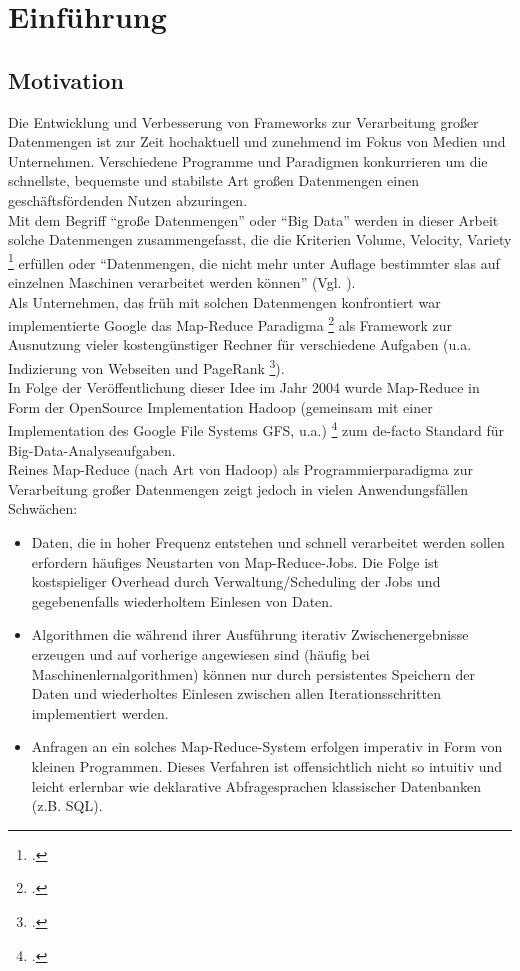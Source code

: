 \chapter{Einführung}

\section{Motivation}

Die Entwicklung und Verbesserung von Frameworks zur Verarbeitung großer Datenmengen ist zur Zeit hochaktuell und zunehmend im Fokus von Medien und Unternehmen. Verschiedene Programme und Paradigmen konkurrieren um die schnellste, bequemste und stabilste Art großen Datenmengen einen geschäftsfördenden Nutzen abzuringen.\\

Mit dem Begriff "`große Datenmengen"' oder "`Big Data"' werden in dieser Arbeit solche Datenmengen zusammengefasst, die die Kriterien Volume, Velocity, Variety \footcite{Lan01} erfüllen oder "`Datenmengen, die nicht mehr unter Auflage bestimmter \gls{sla}s auf einzelnen Maschinen verarbeitet werden können"' (Vgl. \cite{Sam14}).\\

Als Unternehmen, das früh mit solchen Datenmengen konfrontiert war implementierte Google das Map-Reduce Paradigma \footcite{Dean04} als Framework zur Ausnutzung vieler kostengünstiger Rechner für verschiedene Aufgaben (u.a.  Indizierung von Webseiten und PageRank \footcite{page2001method}). \\

In Folge der Veröffentlichung dieser Idee im Jahr 2004 wurde Map-Reduce in Form der OpenSource Implementation Hadoop (gemeinsam mit einer Implementation des Google File Systems GFS, u.a.) \footcite{Ghema03} zum de-facto Standard für Big-Data-Analyseaufgaben.\\

Reines Map-Reduce (nach Art von Hadoop) als Programmierparadigma zur Verarbeitung großer Datenmengen zeigt jedoch in vielen Anwendungsfällen Schwächen:
\begin{itemize}
	\item Daten, die in hoher Frequenz entstehen und schnell verarbeitet werden sollen erfordern häufiges Neustarten von Map-Reduce-Jobs. Die Folge ist kostspieliger Overhead durch Verwaltung/Scheduling der Jobs und gegebenenfalls wiederholtem Einlesen von Daten.
	\item Algorithmen die während ihrer Ausführung iterativ Zwischenergebnisse erzeugen und auf vorherige angewiesen sind (häufig bei Maschinenlernalgorithmen) können nur durch persistentes Speichern der Daten und wiederholtes Einlesen zwischen allen Iterationsschritten implementiert werden.
	\item Anfragen an ein solches Map-Reduce-System erfolgen imperativ in Form von kleinen Programmen. Dieses Verfahren ist offensichtlich nicht so intuitiv und leicht erlernbar wie deklarative Abfragesprachen klassischer Datenbanken (z.B. SQL).
\end{itemize}

